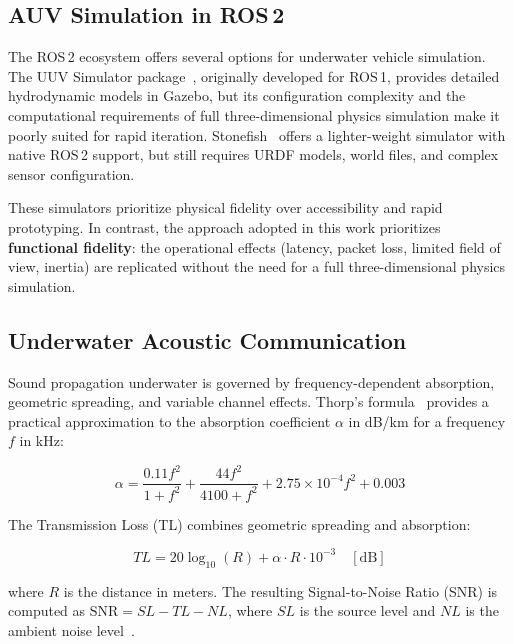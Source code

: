 \documentclass[10pt,twocolumn,letterpaper]{article}
\begin{document}
\subsection{AUV Simulation in ROS\,2}

The ROS\,2 ecosystem offers several options for underwater vehicle simulation. The UUV Simulator package~\cite{uuvsim2016}, originally developed for ROS\,1, provides detailed hydrodynamic models in Gazebo, but its configuration complexity and the computational requirements of full three-dimensional physics simulation make it poorly suited for rapid iteration. Stonefish~\cite{stonefish2020} offers a lighter-weight simulator with native ROS\,2 support, but still requires URDF models, world files, and complex sensor configuration.

These simulators prioritize physical fidelity over accessibility and rapid prototyping. In contrast, the approach adopted in this work prioritizes \textbf{functional fidelity}: the operational effects (latency, packet loss, limited field of view, inertia) are replicated without the need for a full three-dimensional physics simulation.

\subsection{Underwater Acoustic Communication}

Sound propagation underwater is governed by frequency-dependent absorption, geometric spreading, and variable channel effects. Thorp's formula~\cite{thorp1967} provides a practical approximation to the absorption coefficient $\alpha$ in dB/km for a frequency $f$ in kHz:

\begin{equation}
\alpha = \frac{0.11 f^2}{1 + f^2} + \frac{44 f^2}{4100 + f^2} + 2.75 \times 10^{-4} f^2 + 0.003
\label{eq:thorp}
\end{equation}

The Transmission Loss (TL) combines geometric spreading and absorption:

\begin{equation}
TL = 20 \log_{10}(R) + \alpha \cdot R \cdot 10^{-3} \quad [\text{dB}]
\label{eq:tl}
\end{equation}

where $R$ is the distance in meters. The resulting Signal-to-Noise Ratio (SNR) is computed as $\text{SNR} = SL - TL - NL$, where $SL$ is the source level and $NL$ is the ambient noise level~\cite{urick1983}.
\end{document}
